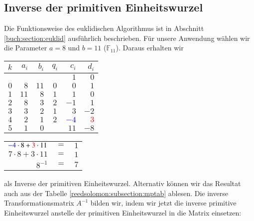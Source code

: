 
\subsection{Inverse der primitiven Einheitswurzel
\label{reedsolomon:subsection:invEinh}}
%
Die Funktionsweise des euklidischen Algorithmus ist in Abschnitt \ref{buch:section:euklid} ausführlich beschrieben.
Für unsere Anwendung wählen wir die Parameter $a = 8$ und $b = 11$ ($\mathbb{F}_{11}$).
Daraus erhalten wir 

\begin{center}

\begin{tabular}{| c | r r | c | r r |}
	\hline
	$k$ & $a_i$ & $b_i$ & $q_i$ & $c_i$ & $d_i$\\
	\hline 
	& & & & $1$& $0$\\
	$0$& $8$& $11$& $0$& $0$& $1$\\
	$1$& $11$& $8$& $1$& $1$& $0$\\
	$2$& $8$& $3$& $2$& $-1$& $1$\\
	$3$& $3$& $2$& $1$& $3$& $-2$\\
	$4$& $2$& $1$& $2$& \textcolor{blue}{$-4$}& \textcolor{red}{$3$}\\
	$5$& $1$& $0$& & $11$& $-8$\\
	\hline
\end{tabular}

\end{center}
\begin{center}

\begin{tabular}{rcl}
	$\textcolor{blue}{-4} \cdot 8 + \textcolor{red}{3} \cdot 11$ &$=$& $1$\\
	$7 \cdot 8 + 3 \cdot 11$ &$=$& $1$\\
	$8^{-1}$ &$=$& $7$
	
\end{tabular}

\end{center}
als Inverse der primitiven Einheitswurzel.
Alternativ können wir das Resultat auch aus der Tabelle \ref{reedsolomon:subsection:mptab} ablesen.
Die inverse Transformationsmatrix $A^{-1}$ bilden wir, indem wir jetzt die inverse primitive Einheitswurzel anstelle der primitiven Einheitswurzel in die Matrix einsetzen:
